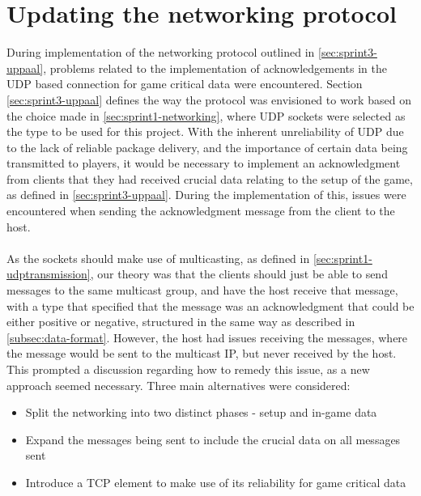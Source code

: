 \section{Updating the networking protocol}\label{sec:update-network-protocol}
During implementation of the networking protocol outlined in \autoref{sec:sprint3-uppaal}, problems related to the implementation of acknowledgements in the UDP based connection for game critical data were encountered.
Section \ref{sec:sprint3-uppaal} defines the way the protocol was envisioned to work based on the choice made in \autoref{sec:sprint1-networking}, where UDP sockets were selected as the type to be used for this project.
With the inherent unreliability of UDP due to the lack of reliable package delivery, and the importance of certain data being transmitted to players, it would be necessary to implement an acknowledgment from clients that they had received crucial data relating to the setup of the game, as defined in \autoref{sec:sprint3-uppaal}.
During the implementation of this, issues were encountered when sending the acknowledgment message from the client to the host.
\\\\
As the sockets should make use of multicasting, as defined in \autoref{sec:sprint1-udptransmission}, our theory was that the clients should just be able to send messages to the same multicast group, and have the host receive that message, with a type that specified that the message was an acknowledgment that could be either positive or negative, structured in the same way as described in \autoref{subsec:data-format}.
However, the host had issues receiving the messages, where the message would be sent to the multicast IP, but never received by the host.
This prompted a discussion regarding how to remedy this issue, as a new approach seemed necessary.
Three main alternatives were considered:
\begin{itemize}
    \item Split the networking into two distinct phases - setup and in-game data
    \item Expand the messages being sent to include the crucial data on all messages sent
    \item Introduce a TCP element to make use of its reliability for game critical data
\end{itemize}

